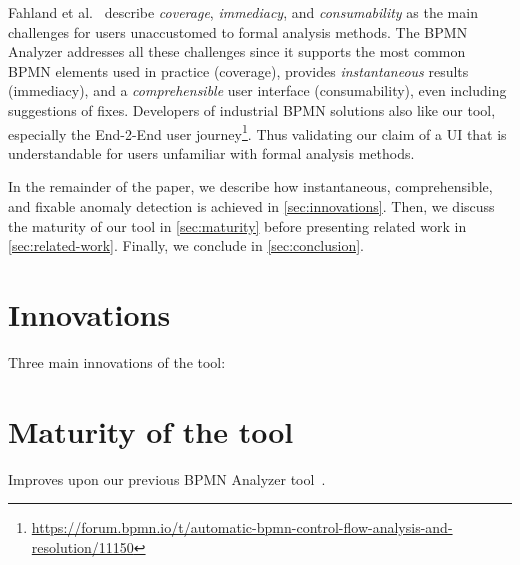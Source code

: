 \documentclass[
]{ceurart}
\begin{document}
Fahland et al.~\cite{fahlandAnalysisDemandInstantaneous2011} describe \textit{coverage}, \textit{immediacy}, and \textit{consumability} as the main challenges for users unaccustomed to formal analysis methods.
The BPMN Analyzer addresses all these challenges since it supports the most common BPMN elements used in practice (coverage), provides \textit{instantaneous} results (immediacy), and a \textit{comprehensible} user interface (consumability), even including suggestions of fixes.
Developers of industrial BPMN solutions also like our tool, especially the End-2-End user journey\footnote{\url{https://forum.bpmn.io/t/automatic-bpmn-control-flow-analysis-and-resolution/11150}}.
Thus validating our claim of a UI that is understandable for users unfamiliar with formal analysis methods.

In the remainder of the paper, we describe how instantaneous, comprehensible, and fixable anomaly detection is achieved in \autoref{sec:innovations}.
Then, we discuss the maturity of our tool in \autoref{sec:maturity} before presenting related work in \autoref{sec:related-work}.
Finally, we conclude in \autoref{sec:conclusion}.

\section{Innovations} \label{sec:innovations} %
Three main innovations of the tool:

\section{Maturity of the tool} \label{sec:maturity}
Improves upon our previous BPMN Analyzer tool~\cite{krauterFormalizationAnalysisBPMN2023}.


\end{document}
